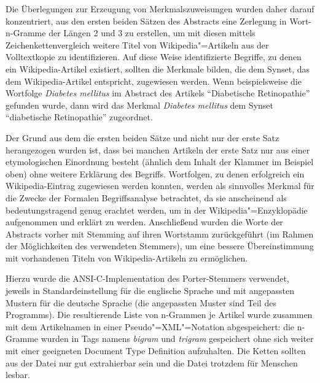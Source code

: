 \documentclass[pagesize,paper=A4,DIV=calc,fontsize=12pt,draft=false]{scrreprt}
\begin{document}

Die Überlegungen zur Erzeugung von Merkmalszuweisungen wurden daher darauf konzentriert, aus den ersten beiden Sätzen des Abstracts eine Zerlegung in Wort-n-Gramme der Längen 2 und 3 zu erstellen, um mit diesen mittels Zeichenkettenvergleich weitere Titel von Wikipedia"=Artikeln aus der Volltextkopie zu identifizieren.
Auf diese Weise identifizierte Begriffe, zu denen ein Wikipedia-Artikel existiert, sollten die Merkmale bilden, die dem Synset, das dem Wikipedia-Artikel entspricht, zugewiesen werden. 
Wenn beispielsweise die Wortfolge \emph{Diabetes mellitus} im Abstract des Artikels \enquote{Diabetische Retinopathie} gefunden wurde, dann wird das Merkmal \emph{Diabetes mellitus} dem Synset \enquote{diabetische Retinopathie} zugeordnet.

Der Grund aus dem die ersten beiden Sätze und nicht nur der erste Satz herangezogen wurden ist, dass bei manchen Artikeln der erste Satz nur aus einer etymologischen Einordnung besteht (ähnlich dem Inhalt der Klammer im Beispiel oben) ohne weitere Erklärung des Begriffs. 
Wortfolgen, zu denen erfolgreich ein Wikipedia-Eintrag zugewiesen werden konnten, werden als sinnvolles Merkmal für die Zwecke der Formalen Begriffsanalyse betrachtet, da sie anscheinend als bedeutungstragend genug erachtet werden, um in der Wikipedia"=Enzyklopädie aufgenommen und erklärt zu werden. Anschließend wurden die Worte der Abstracts vorher mit Stemming auf ihren Wortstamm zurückgeführt (im Rahmen der Möglichkeiten des verwendeten Stemmers), um eine bessere Übereinstimmung mit vorhandenen Titeln von Wikipedia-Artikeln zu ermöglichen.

Hierzu wurde die ANSI-C-Implementation des Porter-Stemmers verwendet, jeweils in Standardeinstellung für die englische Sprache und mit angepassten Mustern für die deutsche Sprache (die angepassten Muster sind Teil des Programms). 
Die resultierende Liste von n-Grammen je Artikel wurde zusammen mit dem Artikelnamen in einer Pseudo"=XML"=Notation abgespeichert: die n-Gramme wurden in Tags namens \emph{bigram} und \emph{trigram} gespeichert ohne sich weiter mit einer geeigneten Document Type Definition aufzuhalten. 
Die Ketten sollten aus der Datei nur gut extrahierbar sein und die Datei trotzdem für Menschen lesbar.
\end{document}
